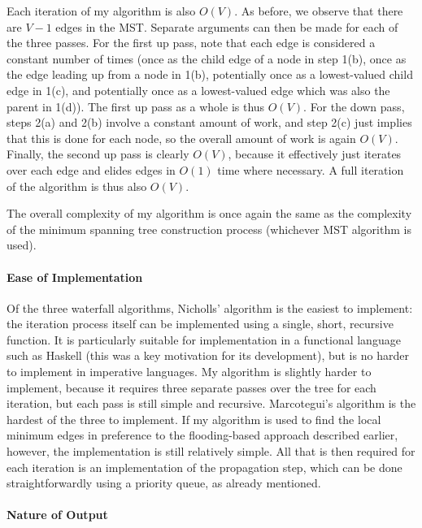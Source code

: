 Each iteration of my algorithm is also $O(V)$. As before, we observe that there are $V - 1$ edges in the MST. Separate arguments can then be made for each of the three passes. For the first up pass, note that each edge is considered a constant number of times (once as the child edge of a node in step 1(b), once as the edge leading up from a node in 1(b), potentially once as a lowest-valued child edge in 1(c), and potentially once as a lowest-valued edge which was also the parent in 1(d)). The first up pass as a whole is thus $O(V)$. For the down pass, steps 2(a) and 2(b) involve a constant amount of work, and step 2(c) just implies that this is done for each node, so the overall amount of work is again $O(V)$. Finally, the second up pass is clearly $O(V)$, because it effectively just iterates over each edge and elides edges in $O(1)$ time where necessary. A full iteration of the algorithm is thus also $O(V)$.

The overall complexity of my algorithm is once again the same as the complexity of the minimum spanning tree construction process (whichever MST algorithm is used).

\paragraph{Ease of Implementation}

Of the three waterfall algorithms, Nicholls' algorithm is the easiest to implement: the iteration process itself can be implemented using a single, short, recursive function. It is particularly suitable for implementation in a functional language such as Haskell (this was a key motivation for its development), but is no harder to implement in imperative languages. My algorithm is slightly harder to implement, because it requires three separate passes over the tree for each iteration, but each pass is still simple and recursive. Marcotegui's algorithm is the hardest of the three to implement. If my algorithm is used to find the local minimum edges in preference to the flooding-based approach described earlier, however, the implementation is still relatively simple. All that is then required for each iteration is an implementation of the propagation step, which can be done straightforwardly using a priority queue, as already mentioned.

\paragraph{Nature of Output}

